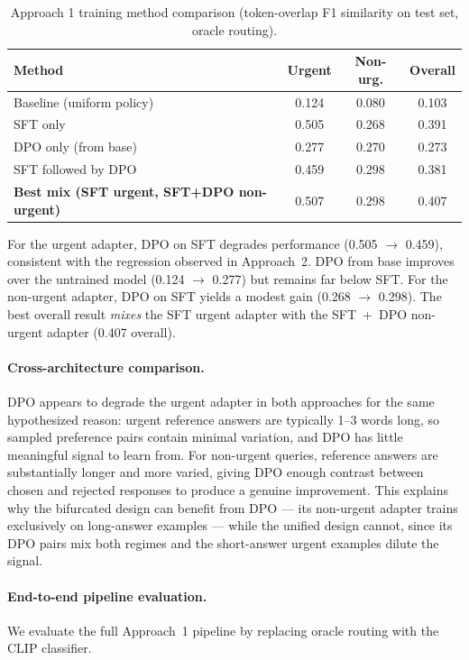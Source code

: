 \documentclass{article}
\begin{document}
\begin{table}[H]
\centering
\caption{Approach 1 training method comparison (token-overlap F1 similarity on test set, oracle routing).}
\label{tab:approach1_methods}
\begin{tabular}{lccc}
\toprule
\textbf{Method} & \textbf{Urgent} & \textbf{Non-urg.} & \textbf{Overall} \\
\midrule
Baseline (uniform policy)     & 0.124 & 0.080 & 0.103 \\
SFT only                      & 0.505 & 0.268 & 0.391 \\
DPO only (from base)          & 0.277 & 0.270 & 0.273 \\
SFT followed by DPO           & 0.459 & 0.298 & 0.381 \\
\textbf{Best mix (SFT urgent, SFT+DPO non-urgent)} & 0.507 & 0.298 & 0.407 \\
\bottomrule
\end{tabular}
\end{table}

For the urgent adapter, DPO on SFT degrades performance (0.505 $\to$ 0.459), consistent with the regression observed in Approach~2. DPO from base improves over the untrained model (0.124 $\to$ 0.277) but remains far below SFT. For the non-urgent adapter, DPO on SFT yields a modest gain (0.268 $\to$ 0.298). The best overall result \emph{mixes} the SFT urgent adapter with the SFT~+~DPO non-urgent adapter (0.407 overall).

\paragraph{Cross-architecture comparison.}
DPO appears to degrade the urgent adapter in both approaches for the same hypothesized reason: urgent reference answers are typically 1--3 words long, so sampled preference pairs contain minimal variation, and DPO has little meaningful signal to learn from. For non-urgent queries, reference answers are substantially longer and more varied, giving DPO enough contrast between chosen and rejected responses to produce a genuine improvement. This explains why the bifurcated design can benefit from DPO --- its non-urgent adapter trains exclusively on long-answer examples --- while the unified design cannot, since its DPO pairs mix both regimes and the short-answer urgent examples dilute the signal.

\paragraph{End-to-end pipeline evaluation.}
We evaluate the full Approach~1 pipeline by replacing oracle routing with the CLIP classifier.
\end{document}

